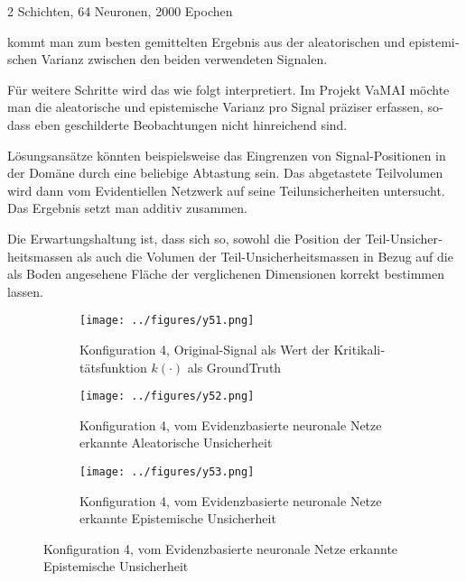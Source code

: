 \begin{otherlanguage}{ngerman}
2 Schichten, 64 Neuronen, 2000 Epochen 

kommt man zum besten gemittelten Ergebnis aus der aleatorischen und epistemischen Varianz zwischen den beiden verwendeten Signalen. 

Für weitere Schritte wird das wie folgt interpretiert. Im Projekt VaMAI möchte man die aleatorische und epistemische Varianz pro Signal präziser erfassen, sodass eben geschilderte Beobachtungen nicht hinreichend sind. 

Lösungsansätze könnten beispielsweise das Eingrenzen von Signal-Positionen in der Domäne durch eine beliebige Abtastung sein. Das abgetastete Teilvolumen wird dann vom Evidentiellen Netzwerk auf seine Teilunsicherheiten untersucht. Das Ergebnis setzt man additiv zusammen. 

Die Erwartungshaltung ist, dass sich so, sowohl die Position der Teil-Unsicherheitsmassen als auch die Volumen der Teil-Unsicherheitsmassen in Bezug auf die als Boden angesehene Fläche der verglichenen Dimensionen korrekt bestimmen lassen. 



\begin{figure}[!ht]
  \centering

  \begin{subfigure}[t]{\textwidth}
    \centering
    \texttt{[image: ../figures/y51.png]}
    \caption{Konfiguration 4, Original-Signal als Wert der Kritikalitätsfunktion \(k(\cdot)\) als \gls{GroundTruth}}
    \label{fig:bild31}
  \end{subfigure}

  \vspace{0.5em}

  \begin{subfigure}[t]{\textwidth}
    \centering
    \texttt{[image: ../figures/y52.png]}
    \caption{Konfiguration 4, vom \gls{Evidenzbasierte neuronale Netze} erkannte \gls{Aleatorische Unsicherheit}}
    \label{fig:bild32}
  \end{subfigure}

  \vspace{0.5em}

  \begin{subfigure}[t]{\textwidth}
    \centering
    \texttt{[image: ../figures/y53.png]}
    \caption{Konfiguration 4, vom \gls{Evidenzbasierte neuronale Netze} erkannte \gls{Epistemische Unsicherheit}}
    \label{fig:bild33}
  \end{subfigure}


\end{figure}
\end{otherlanguage}
